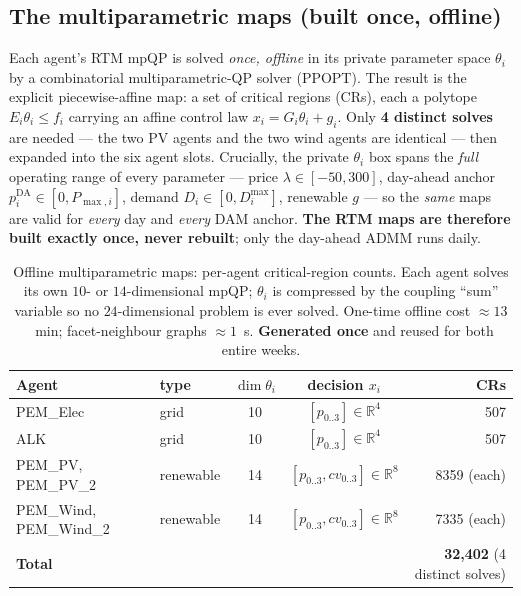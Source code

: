 \documentclass[11pt, letterpaper]{article}
\begin{document}
\subsection{The multiparametric maps (built once, offline)}
Each agent's RTM mpQP is solved \emph{once, offline} in its private parameter space $\theta_i$ by a
combinatorial multiparametric-QP solver (PPOPT). The result is the explicit piecewise-affine map:
a set of critical regions (CRs), each a polytope $E_i\theta_i\le f_i$ carrying an affine control law
$x_i=G_i\theta_i+g_i$. Only \textbf{4 distinct solves} are needed --- the two PV agents and the two
wind agents are identical --- then expanded into the six agent slots. Crucially, the private
$\theta_i$ box spans the \emph{full} operating range of every parameter --- price
$\lambda\in[-50,300]$, day-ahead anchor $p^{\mathrm{DA}}_i\in[0,P_{\max,i}]$, demand
$D_i\in[0,D^{\max}_i]$, renewable $g$ --- so the \emph{same} maps are valid for \emph{every} day and
\emph{every} DAM anchor. \textbf{The RTM maps are therefore built exactly once, never rebuilt}; only
the day-ahead ADMM runs daily.

\begin{table}[H]\centering
\begin{tabular}{llccr}
\toprule
Agent & type & $\dim\theta_i$ & decision $x_i$ & CRs\\
\midrule
PEM\_Elec         & grid       & 10 & $[p_{0..3}]\in\mathbb R^4$        & 507\\
ALK               & grid       & 10 & $[p_{0..3}]\in\mathbb R^4$        & 507\\
PEM\_PV, PEM\_PV\_2 & renewable & 14 & $[p_{0..3},cv_{0..3}]\in\mathbb R^8$ & 8359 (each)\\
PEM\_Wind, PEM\_Wind\_2 & renewable & 14 & $[p_{0..3},cv_{0..3}]\in\mathbb R^8$ & 7335 (each)\\
\midrule
\textbf{Total} & & & & \textbf{32{,}402} (4 distinct solves)\\
\bottomrule
\end{tabular}
\caption{Offline multiparametric maps: per-agent critical-region counts. Each agent solves its own
$10$- or $14$-dimensional mpQP; $\theta_i$ is compressed by the coupling ``sum'' variable so no
$24$-dimensional problem is ever solved. One-time offline cost $\approx\!13$~min; facet-neighbour
graphs $\approx\!1$~s. \textbf{Generated once} and reused for both entire weeks.}
\label{tab:cr}
\end{table}

\end{document}
